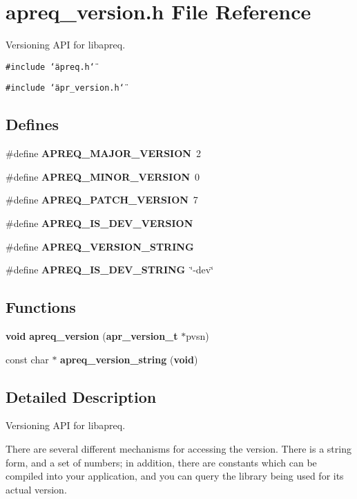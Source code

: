 \section{apreq\_\-version.h File Reference}
\label{apreq__version_8h}
Versioning API for libapreq. 


{\tt \#include \char`\"{}apreq.h\char`\"{}}\par
{\tt \#include \char`\"{}apr\_\-version.h\char`\"{}}\par
\subsection*{Defines}
\begin{CompactItemize}
\item 
\#define {\bf APREQ\_\-MAJOR\_\-VERSION}\ 2
\item 
\#define {\bf APREQ\_\-MINOR\_\-VERSION}\ 0
\item 
\#define {\bf APREQ\_\-PATCH\_\-VERSION}\ 7
\item 
\#define {\bf APREQ\_\-IS\_\-DEV\_\-VERSION}
\item 
\#define {\bf APREQ\_\-VERSION\_\-STRING}
\item 
\#define {\bf APREQ\_\-IS\_\-DEV\_\-STRING}\ \char`\"{}-dev\char`\"{}
\end{CompactItemize}
\subsection*{Functions}
\begin{CompactItemize}
\item 
{\bf void} {\bf apreq\_\-version} ({\bf apr\_\-version\_\-t} $\ast$pvsn)
\item 
const char $\ast$ {\bf apreq\_\-version\_\-string} ({\bf void})
\end{CompactItemize}


\subsection{Detailed Description}
Versioning API for libapreq.





 There are several different mechanisms for accessing the version. There is a string form, and a set of numbers; in addition, there are constants which can be compiled into your application, and you can query the library being used for its actual version.

